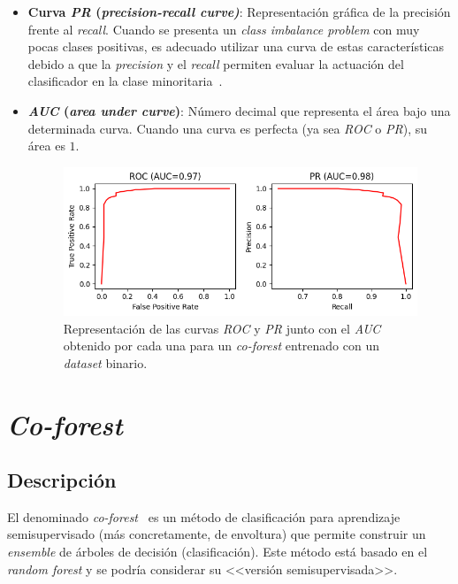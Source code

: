 \begin{itemize}
	\item \textbf{Curva \textit{PR} (\textit{precision-recall curve)}}:  Representación gráfica de la precisión frente al \textit{recall}. Cuando se presenta un \textit{class imbalance problem} con muy pocas clases positivas, es adecuado utilizar una curva de estas características debido a que la \textit{precision} y el \textit{recall} permiten evaluar la actuación del clasificador en la clase minoritaria~\cite{imbalanced2013Haibo}.
	
	\item \textbf{\textit{AUC} (\textit{area under curve})}: Número decimal que representa el área bajo una determinada curva. Cuando una curva es perfecta (ya sea \textit{ROC} o \textit{PR}), su área es $1$.
	
	\begin{figure}[h]
		\caption[AUC curvas ROC y PR]{Representación de las curvas \textit{ROC} y \textit{PR} junto con el \textit{AUC} obtenido por cada una para un \textit{co-forest} entrenado con un \textit{dataset} binario.}
		\label{img:curva_roc_pr}
		\centering
		\includegraphics[scale=0.7]{../img/memoria/3_auc_roc_pr}
	\end{figure}
	
\end{itemize}












\section{\textit{Co-forest}}

\subsection{Descripción}

El denominado \textit{co-forest}~\cite{originalCoForest2007} es un método de clasificación para aprendizaje semisupervisado (más concretamente, de envoltura) que permite construir un \textit{ensemble} de árboles de decisión (clasificación). Este método está basado en el \textit{random forest} y se podría considerar su <<versión semisupervisada>>. 

